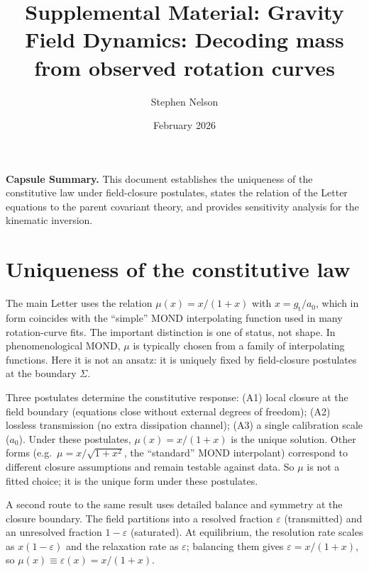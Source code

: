 \documentclass[aps,amsmath,amssymb,reprint,nofootinbib]{revtex4-2}
\begin{document}
\title{Supplemental Material: Gravity Field Dynamics: Decoding mass from observed rotation curves}

\author{Stephen Nelson}

\date{February 2026}

\maketitle

\noindent\textbf{Capsule Summary.}
This document establishes the uniqueness of the constitutive law under field-closure postulates, states the relation of the Letter equations to the parent covariant theory, and provides sensitivity analysis for the kinematic inversion.

\section{Uniqueness of the constitutive law}
\label{sec:uniqueness}

The main Letter uses the relation $\mu(x) = x/(1+x)$ with $x = g_{\mathrm{t}}/a_0$, which in form coincides with the ``simple'' MOND interpolating function used in many rotation-curve fits. The important distinction is one of status, not shape. In phenomenological MOND, $\mu$ is typically chosen from a family of interpolating functions. Here it is not an ansatz: it is uniquely fixed by field-closure postulates at the boundary $\Sigma$.

Three postulates determine the constitutive response: (A1) local closure at the field boundary (equations close without external degrees of freedom); (A2) lossless transmission (no extra dissipation channel); (A3) a single calibration scale ($a_0$). Under these postulates, $\mu(x) = x/(1+x)$ is the unique solution. Other forms (e.g.\ $\mu = x/\sqrt{1+x^2}$, the ``standard'' MOND interpolant) correspond to different closure assumptions and remain testable against data. So $\mu$ is not a fitted choice; it is the unique form under these postulates.

A second route to the same result uses detailed balance and symmetry at the closure boundary. The field partitions into a resolved fraction $\varepsilon$ (transmitted) and an unresolved fraction $1 - \varepsilon$ (saturated). At equilibrium, the resolution rate scales as $x(1-\varepsilon)$ and the relaxation rate as $\varepsilon$; balancing them gives $\varepsilon = x/(1+x)$, so $\mu(x) \equiv \varepsilon(x) = x/(1+x)$.
\end{document}
